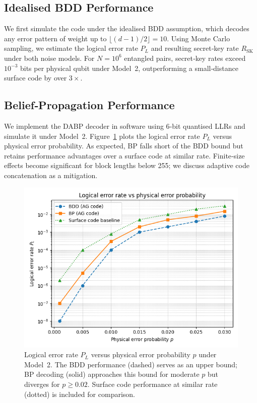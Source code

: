 \documentclass[conference]{IEEEtran}
\begin{document}
    \subsection{Idealised BDD Performance}
    We first simulate the code under the idealised BDD assumption, which decodes any error pattern of weight up to 
$\lfloor (d-1)/2 \rfloor=10$.  Using Monte Carlo sampling, we estimate the logical error rate $P_L$ and resulting 
secret‑key rate $R_{\mathrm{SK}}$ under both noise models.  For $N=10^6$ entangled pairs, secret‑key rates exceed 
$10^{-3}$ bits per physical qubit under Model 2, outperforming a small‑distance surface code by over $3\times$.

    \subsection{Belief‑Propagation Performance}
    We implement the DABP decoder in software using 6‑bit quantised LLRs and simulate it under Model 2.  
Figure~\ref{fig:ber} plots the logical error rate $P_L$ versus physical error probability.  As expected, BP falls short 
of the BDD bound but retains performance advantages over a surface code at similar rate.  Finite‑size effects become 
significant for block lengths below 255; we discuss adaptive code concatenation as a mitigation.

    \begin{figure}[t]
    \centering
    \includegraphics[width=0.85\linewidth]{logical_error_rate.png}
    \caption{Logical error rate $P_L$ versus physical error probability $p$ under Model 2.  The BDD performance (dashed)
  serves as an upper bound; BP decoding (solid) approaches this bound for moderate $p$ but diverges for $p\ge0.02$.  
Surface code performance at similar rate (dotted) is included for comparison.}
    \label{fig:ber}
    \end{figure}
\end{document}
